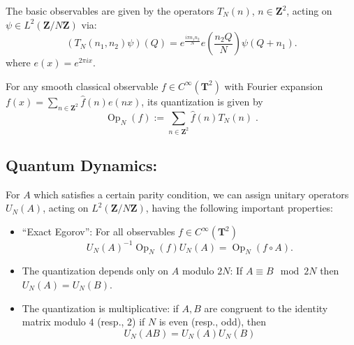 \documentclass[12pt]{amsart}
\theoremstyle{plain}
\newcommand{\Z}{{\mathbf Z}}
\newcommand{\TT}{\mathbf T^2}
\newcommand{\TN}{T_N}  %
\newcommand{\OPN}{\operatorname{Op}_N}
\newcommand{\UN}{U_N}
\renewcommand{\^}{\widehat}
\begin{document}
The basic observables are given by the operators $\TN(n)$, $n\in
\Z^2$, acting on $\psi \in L^2(\Z/N\Z)$ via: 
%
\begin{equation}\label{action of T(n)}
\left( \TN(n_1,n_2)\psi \right) (Q) =
e^{\frac {i\pi n_1 n_2}N} e(\frac{n_2Q}N)\psi(Q+n_1).
\end{equation}
where 
$e(x) = e^{2\pi i x}$.  

For any smooth classical observable 
$f\in C^\infty(\TT)$ with  Fourier expansion 
$f(x) = \sum_{n\in \Z^2} \widehat f(n) e(nx)$, 
its quantization is given by 
$$
\OPN(f) := \sum_{n\in \Z^2} \widehat f(n)  \TN(n) \;.
$$


\subsection{Quantum Dynamics:}\label{dynamics} 
For $A$ which satisfies a certain parity condition, 
we can assign unitary operators $\UN(A)$,
acting on $L^2(\Z/N\Z)$, having the following important properties:
\begin{itemize}
\item 
``Exact Egorov'':  For all observables $f \in C^\infty(\TT)$
$$ 
 \UN(A)^{-1}  \OPN(f) \UN(A)= \OPN(f\circ A).
$$
\item The quantization depends only on $A$ modulo $2N$: If 
$A  \equiv B \mod 2N$ then  $\UN(A)=\UN(B)$. 
\item The quantization is multiplicative: if $A,B$ are 
congruent to the identity matrix modulo $4$ (resp., $2$) if $N$ is
even (resp., odd), then \cite{cat1, Mezzadri}
\begin{equation*}%
\UN(AB)=\UN(A)\UN(B)
\end{equation*}
\end{itemize}
\end{document}
